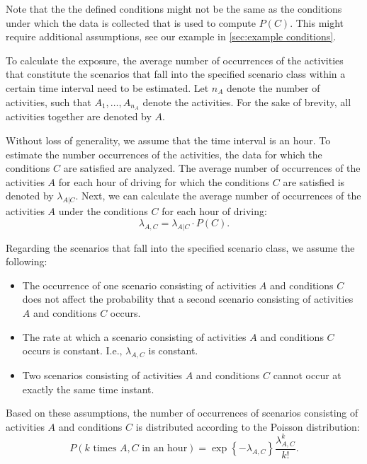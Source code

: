 Note that the the defined conditions might not be the same as the conditions under which the data is collected that is used to compute $P(C)$. This might require additional assumptions, see our example in \cref{sec:example conditions}.

To calculate the exposure, the average number of occurrences of the activities that constitute the scenarios that fall into the specified scenario class within a certain time interval need to be estimated. Let $n_A$ denote the number of activities, such that $A_1, \ldots, A_{n_A}$ denote the activities. For the sake of brevity, all activities together are denoted by $A$. 

Without loss of generality, we assume that the time interval is an hour. To estimate the number occurrences of the activities, the data for which the conditions $C$ are satisfied are analyzed. The average number of occurrences of the activities $A$ for each hour of driving for which the conditions $C$ are satisfied is denoted by $\lambda_{A|C}$. Next, we can calculate the average number of occurrences of the activities $A$ under the conditions $C$ for each hour of driving:
\begin{equation}
	\lambda_{A,C} = \lambda_{A|C} \cdot P(C).
\end{equation}

Regarding the scenarios that fall into the specified scenario class, we assume the following:
\begin{itemize}
	\item The occurrence of one scenario consisting of activities $A$ and conditions $C$ does not affect the probability that a second scenario consisting of activities $A$ and conditions $C$ occurs.
	\item The rate at which a scenario consisting of activities $A$ and conditions $C$ occurs is constant. I.e., $\lambda_{A,C}$ is constant.
	\item Two scenarios consisting of activities $A$ and conditions $C$ cannot occur at exactly the same time instant.
\end{itemize}
Based on these assumptions, the number of occurrences of scenarios consisting of activities $A$ and conditions $C$ is distributed according to the Poisson distribution:
\begin{equation}
	P(k\text{ times }A,C\text{ in an hour}) = \exp \left\{-\lambda_{A,C} \right\} \frac{\lambda_{A,C}^k}{k!}.
\end{equation}



